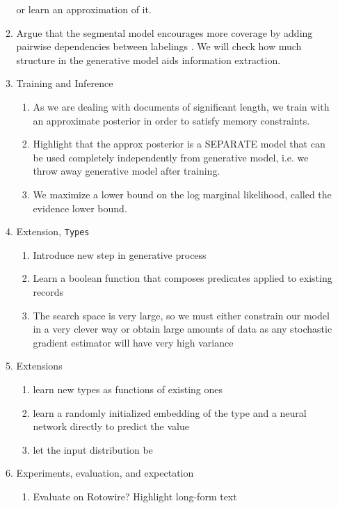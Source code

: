 \documentclass[11pt]{article}
\begin{document}
\begin{enumerate}
\begin{enumerate}
        or learn an approximation of it.
    \item Argue that the segmental model encourages more coverage
        by adding pairwise dependencies between labelings \citep{liang2009semalign}.
        We will check how much structure in the generative model
        aids information extraction.
    \item Training and Inference
        \begin{enumerate}
        \item As we are dealing with documents of significant length,
            we train with an approximate posterior in order to satisfy memory constraints.
        \item Highlight that the approx posterior is a SEPARATE model
            that can be used completely independently from generative model,
            i.e. we throw away generative model after training.
        \item We maximize a lower bound on the log marginal likelihood,
            called the evidence lower bound.
        \end{enumerate}
    \item Extension, \texttt{Types}
        \begin{enumerate}
        \item Introduce new step in generative process
        \item Learn a boolean function that composes predicates applied to existing
            records
        \item The search space is very large, so we must either constrain our model 
            in a very clever way or obtain 
            large amounts of data as any stochastic gradient estimator will have very high variance
        \end{enumerate}
    \item Extensions
        \begin{enumerate}
        \item learn new types as functions of existing ones
        \item learn a randomly initialized embedding of the type
            and a neural network directly to predict the value
        \item let the input distribution be 
        \end{enumerate}
    \item Experiments, evaluation, and expectation
        \begin{enumerate}
        \item Evaluate on Rotowire? Highlight long-form text

\end{enumerate}
\end{enumerate}
\end{enumerate}
\end{document}

